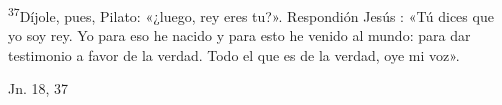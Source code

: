 \documentclass[../../rosario.tex]{subfiles}
\begin{document}
    \textsuperscript{37}Díjole, pues, Pilato: «¿luego, rey eres tu?». Respondión Jesús : «Tú dices que yo soy rey. Yo para eso he nacido y para esto he venido
    al mundo: para dar testimonio a favor de la verdad. Todo el que es de la verdad, oye mi voz».
    \begin{flushright}
    Jn. 18, 37
    \end{flushright}
\end{document}
